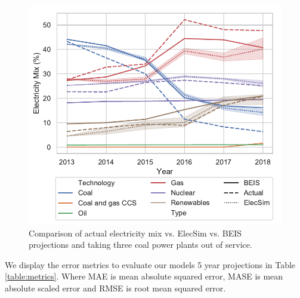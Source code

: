 



\begin{figure}
	\centering
	\includegraphics[width=\columnwidth]{Chapter4/figures/e-Energy-2020/results/throughout_years_beis_elecsim_comparison_coal_dropout_leg_below.pdf}
	\caption{Comparison of actual electricity mix vs. ElecSim vs. BEIS projections and taking three coal power plants out of service.}
	\label{fig:beis_elecsim_historic_comparison}
\end{figure}



We display the error metrics to evaluate our models 5 year projections in Table \ref{table:metrics}. Where MAE is mean absolute squared error, MASE is mean absolute scaled error and RMSE is root mean squared error.

